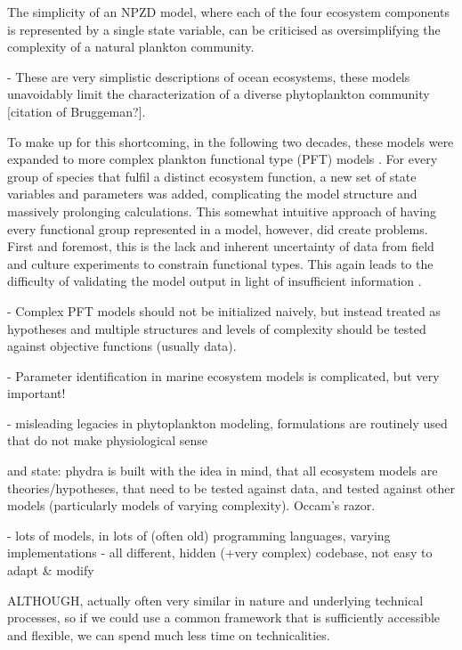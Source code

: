\documentclass[journal abbreviation, manuscript]{copernicus}
\begin{document}
The simplicity of an NPZD model, where each of the four ecosystem components is represented by a single state variable, can be criticised as oversimplifying the complexity of a natural plankton community.

- These are very simplistic descriptions of ocean ecosystems, these models unavoidably limit the characterization of a diverse phytoplankton community [citation of Bruggeman?]. 

To make up for this shortcoming, in the following two decades, these models were expanded to more complex plankton functional type (PFT) models \citep{LeQuere2005}. For every group of species that fulfil a distinct ecosystem function, a new set of state variables and parameters was added, complicating the model structure and massively prolonging calculations. This somewhat intuitive approach of having every functional group represented in a model, however, did create problems. First and foremost, this is the lack and inherent uncertainty of data from field and culture experiments to constrain functional types. This again leads to the difficulty of validating the model output in light of insufficient information \citep{Shimoda2016}.

- Complex PFT models should not be initialized naively, but instead treated as hypotheses and multiple structures and levels of complexity should be tested against objective functions (usually data). \citep{Franks2009}

- Parameter identification in marine ecosystem models is complicated, but very important! \citep{Schartau2017}

- misleading legacies in phytoplankton modeling, formulations are routinely used that do not make physiological sense \citep{Smith2014}

and state: phydra is built with the idea in mind, that all ecosystem models are theories/hypotheses, that need to be tested against data, and tested against other models (particularly models of varying complexity). Occam's razor. 

- lots of models, in lots of (often old) programming languages, varying implementations
- all different, hidden (+very complex) codebase, not easy to adapt \& modify

ALTHOUGH, actually often very similar in nature and underlying technical processes, so if we could use a common framework that is sufficiently accessible and flexible, we can spend much less time on technicalities.
\end{document}
